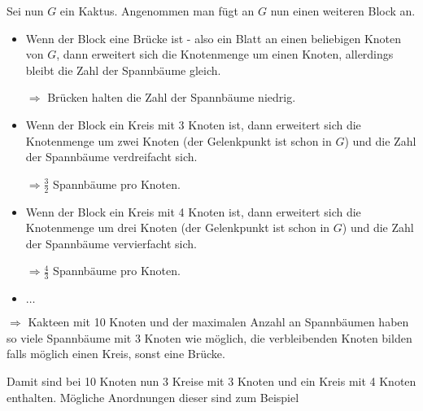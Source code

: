 \documentclass{scrreprt}
\begin{document}
Sei nun $G$ ein Kaktus.
Angenommen man fügt an $G$ nun einen weiteren Block an.
\begin{itemize}
\item Wenn der Block eine Brücke ist - also ein Blatt an einen beliebigen Knoten
  von $G$, dann erweitert sich die Knotenmenge um einen Knoten, allerdings
  bleibt die Zahl der Spannbäume gleich.

  $\Rightarrow$ Brücken halten die Zahl der Spannbäume niedrig.

\item Wenn der Block ein Kreis mit 3 Knoten ist, dann erweitert sich die
  Knotenmenge um zwei Knoten (der Gelenkpunkt ist schon in $G$) und die
  Zahl der Spannbäume verdreifacht sich.

  $\Rightarrow \frac{3}{2}$ Spannbäume pro Knoten.

\item Wenn der Block ein Kreis mit 4 Knoten ist, dann erweitert sich die
  Knotenmenge um drei Knoten (der Gelenkpunkt ist schon in $G$) und die
  Zahl der Spannbäume vervierfacht sich.

  $\Rightarrow \frac{4}{3}$ Spannbäume pro Knoten.

\item $\ldots$
\end{itemize}

$\Rightarrow$ Kakteen mit 10 Knoten und der maximalen Anzahl an Spannbäumen
haben so viele Spannbäume mit 3 Knoten wie möglich, die verbleibenden Knoten
bilden falls möglich einen Kreis, sonst eine Brücke.

Damit sind bei 10 Knoten nun 3 Kreise mit 3 Knoten und ein Kreis mit 4 Knoten
enthalten.
Mögliche Anordnungen dieser sind zum Beispiel
\end{document}
